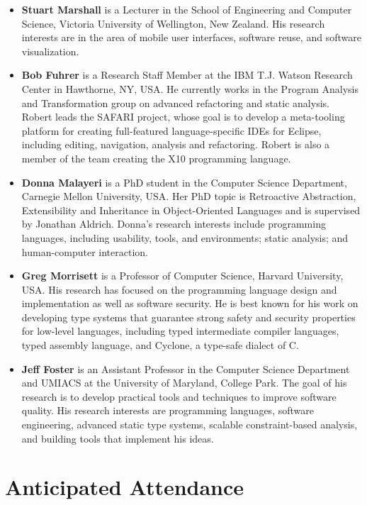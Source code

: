 \documentclass{acm_proc_article-sp}
\begin{document}
\begin{itemize}
\item \textbf{Stuart Marshall} is a Lecturer in the School of Engineering and Computer Science, Victoria University of Wellington, New Zealand. His research interests are in the area of mobile user interfaces, software reuse, and software visualization.

\item \textbf{Bob Fuhrer} is a Research Staff Member at the IBM T.J. Watson Research Center in Hawthorne, NY, USA. He currently works in the Program Analysis and Transformation group on advanced refactoring and static analysis. Robert leads the SAFARI project, whose goal is to develop a meta-tooling platform for creating full-featured language-specific IDEs for Eclipse, including editing, navigation, analysis and refactoring. Robert is also a member of the team creating the X10 programming language.

\item \textbf{Donna Malayeri} is a PhD student in the Computer Science Department, Carnegie Mellon University, USA. Her PhD topic is Retroactive Abstraction, Extensibility and Inheritance in Object-Oriented Languages and is supervised by Jonathan Aldrich. Donna's research interests include programming languages, including usability, tools, and environments; static analysis;  and human-computer interaction. 

\item \textbf{Greg Morrisett} is a Professor of Computer Science, Harvard University, USA. His research has focused on the programming language design and implementation as well as software security.  He is best known for his work on developing type systems that guarantee strong safety and security properties for low-level languages, including typed intermediate compiler languages, typed assembly language, and Cyclone, a type-safe dialect of C.

\item \textbf{Jeff Foster} is an Assistant Professor in the Computer Science Department and UMIACS at the University of Maryland, College Park. The goal of his research is to develop practical tools and techniques to improve software quality. His research interests are programming languages, software engineering, advanced static type systems, scalable constraint-based analysis, and building tools that implement his ideas.

\end{itemize}

\section{Anticipated Attendance}
\end{document}
